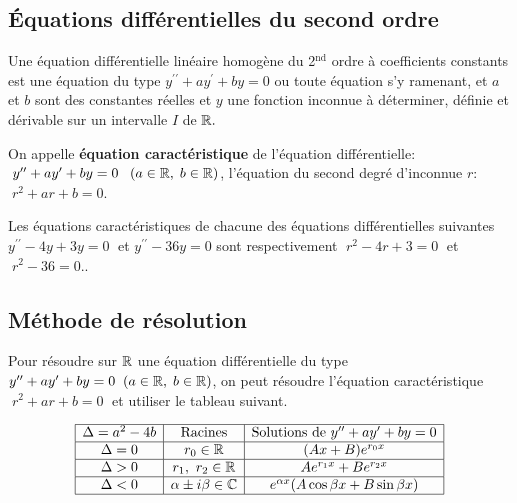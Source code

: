 \subsection{Équations différentielles du second ordre}
\begin{definition}
Une équation différentielle linéaire homogène du 2$ ^{\text{nd}} $ ordre  à coefficients constants  est une équation du type  $y^{\prime \prime} +ay^{\prime}+by= 0$\; ou toute équation s'y ramenant, et $a $ et $ b$ sont des constantes réelles et $ y $ une fonction inconnue à déterminer, définie et dérivable sur un intervalle $ I$ de  $ \mathbb{R}.$
\end{definition}


 \begin{definition}
 
On appelle  \textbf{équation caractéristique} de l'équation différentielle: $\; y^{\prime \prime} +ay^{\prime}+by=0 \;\;\;(a\in\mathbb{R},\; b\in\mathbb{R})$, l'équation du second degré  d'inconnue $ r :\;\; $  $\; r^{2}+ar+b=0 $.
\end{definition}
\begin{example}
Les équations caractéristiques de chacune des   équations différentielles suivantes \\$ y^{\prime \prime}-4y+3y=0 \;$ et \;$ y^{\prime \prime}-36y=0 $ sont respectivement  $\; r^{2} -4r+3=0\;$ et $\; r^{2}-36=0.$. 
\end{example}
\subsection*{Méthode de résolution}
Pour résoudre sur $ \mathbb{R} $  une équation différentielle du type $ y^{\prime \prime}+ ay^{\prime}+by=0\;\;(a\in\mathbb{R},\; b\in\mathbb{R})$, on peut  résoudre l'équation caractéristique \\ $\; r^{2}+ar+b=0 \;$  et utiliser le tableau suivant.




$$
\begin{array}{|c|c|c|}
\hline
\Delta = a^2 - 4b & \text{Racines} & \text{Solutions de } y'' + ay' + by = 0 \\
\hline
\Delta = 0 & r_0 \in \mathbb{R} & (Ax + B)e^{r_0 x} \\
\hline
\Delta > 0 & r_1,\ r_2 \in \mathbb{R} & Ae^{r_1 x} + Be^{r_2 x} \\
\hline
\Delta < 0 & \alpha \pm i\beta \in \mathbb{C} & e^{\alpha x}(A\cos\beta x + B\sin\beta x) \\
\hline
\end{array}
$$

